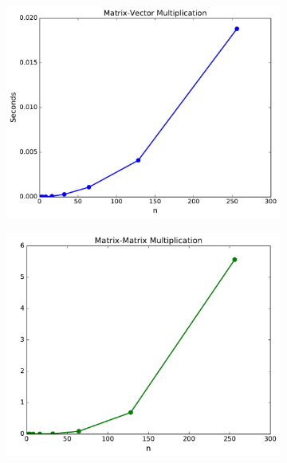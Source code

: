 \begin{problem}
\begin{figure}[H] %
\captionsetup[subfigure]{justification=centering}
\centering
\begin{subfigure}{.5\textwidth}
    \centering
    \includegraphics[width=\linewidth]{figures/matrixVectorMultiplication.pdf}
\end{subfigure}%
\begin{subfigure}{.474\textwidth}
    \centering
    \includegraphics[width=\linewidth]{figures/matrixMatrixMultiplication.pdf}
\end{subfigure}
\end{figure}

\label{prob:matrix-multiplication-timing}
\end{problem}

